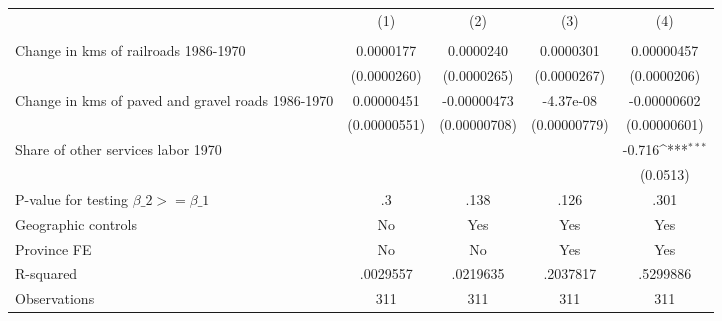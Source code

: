 {
\def\sym#1{\ifmmode^{#1}\else\(^{#1}\)\fi}
\begin{tabular}{l*{4}{c}}
\hline\hline
                &\multicolumn{1}{c}{(1)}&\multicolumn{1}{c}{(2)}&\multicolumn{1}{c}{(3)}&\multicolumn{1}{c}{(4)}\\
                &\multicolumn{1}{c}{}&\multicolumn{1}{c}{}&\multicolumn{1}{c}{}&\multicolumn{1}{c}{}\\
\hline
Change in kms of railroads 1986-1970&0.0000177         &0.0000240         &0.0000301         &0.00000457         \\
                &(0.0000260)         &(0.0000265)         &(0.0000267)         &(0.0000206)         \\
[1em]
Change in kms of paved and gravel roads 1986-1970&0.00000451         &-0.00000473         &-4.37e-08         &-0.00000602         \\
                &(0.00000551)         &(0.00000708)         &(0.00000779)         &(0.00000601)         \\
[1em]
Share of other services labor 1970&                  &                  &                  &   -0.716\sym{***}\\
                &                  &                  &                  & (0.0513)         \\
\hline
P-value for testing $\beta\_{2} >= \beta\_{1}$&       .3         &     .138         &     .126         &     .301         \\
Geographic controls&       No         &      Yes         &      Yes         &      Yes         \\
Province FE     &       No         &       No         &      Yes         &      Yes         \\
R-squared       & .0029557         & .0219635         & .2037817         & .5299886         \\
Observations    &      311         &      311         &      311         &      311         \\
\hline\hline
\end{tabular}
}

